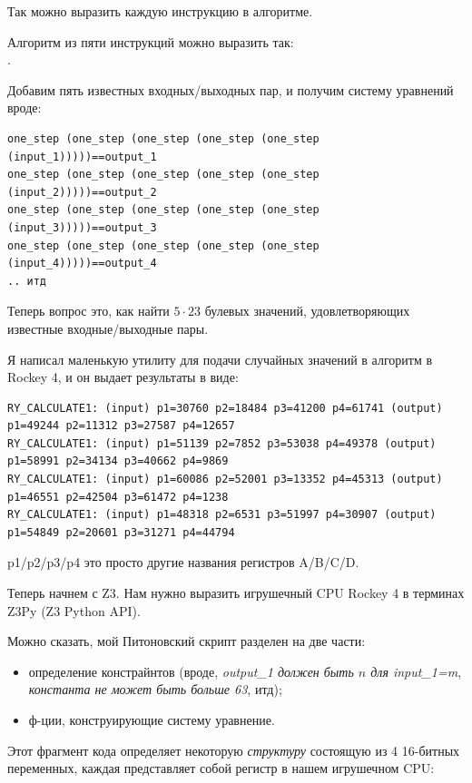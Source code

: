 Так можно выразить каждую инструкцию в алгоритме.

Алгоритм из пяти инструкций можно выразить так:\\
.

Добавим пять известных входных/выходных пар, и получим систему уравнений вроде:

\begin{lstlisting}
one_step (one_step (one_step (one_step (one_step (input_1)))))==output_1
one_step (one_step (one_step (one_step (one_step (input_2)))))==output_2
one_step (one_step (one_step (one_step (one_step (input_3)))))==output_3
one_step (one_step (one_step (one_step (one_step (input_4)))))==output_4
.. итд
\end{lstlisting}

Теперь вопрос это, как найти $5 \cdot 23$ булевых значений, удовлетворяющих известные входные/выходные пары.

Я написал маленькую утилиту для подачи случайных значений в алгоритм в Rockey 4, и он выдает результаты в виде:

\begin{lstlisting}
RY_CALCULATE1: (input) p1=30760 p2=18484 p3=41200 p4=61741 (output) p1=49244 p2=11312 p3=27587 p4=12657
RY_CALCULATE1: (input) p1=51139 p2=7852 p3=53038 p4=49378 (output) p1=58991 p2=34134 p3=40662 p4=9869
RY_CALCULATE1: (input) p1=60086 p2=52001 p3=13352 p4=45313 (output) p1=46551 p2=42504 p3=61472 p4=1238
RY_CALCULATE1: (input) p1=48318 p2=6531 p3=51997 p4=30907 (output) p1=54849 p2=20601 p3=31271 p4=44794
\end{lstlisting}

p1/p2/p3/p4 это просто другие названия регистров A/B/C/D.

Теперь начнем с Z3. Нам нужно выразить игрушечный CPU Rockey 4 в терминах Z3Py (Z3 Python \ac{API}).

Можно сказать, мой Питоновский скрипт разделен на две части:

\begin{itemize}
\item определение констрайнтов (вроде, \textit{output\_1 должен быть $n$ для input\_1=m},
\textit{константа не может быть больше 63}, итд); 

\item ф-ции, конструирующие систему уравнение.
\end{itemize}

Этот фрагмент кода определяет некоторую \textit{структуру} состоящую из 4 16-битных переменных,
каждая представляет собой регистр в нашем игрушечном \ac{CPU}:

